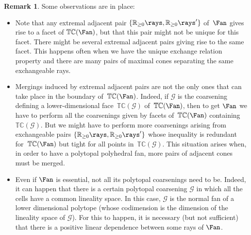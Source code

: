 \documentclass{amsart}
\theoremstyle{definition}
\newtheorem{remark}[theorem]{Remark}
\newcommand{\R}{\mathbb{R}} %
\newcommand{\cal}[1]{{\mathcal{#1}}} %
\newcommand{\typeCone}{\mathbb{TC}} %
\newcommand{\ctypeCone}{\smash{\overline{\mathbb{TC}}}} %
\begin{document}
\begin{remark}
Some observations are in place:

\begin{itemize}
\item Note that any extremal adjacent pair $\{\R_{\ge0}\rays, \R_{\ge0}\rays'\}$ of~$\Fan$ gives rise to a facet of $\ctypeCone(\Fan)$, but that this pair might not be unique for this facet. There might be several extremal adjacent pairs giving rise to the same facet. This happens often when we have the unique exchange relation property and there are many pairs of maximal cones separating the same exchangeable rays.
 
\item Mergings induced by extremal adjacent pairs are not the only ones that can take place in the boundary of~$\ctypeCone(\Fan)$. Indeed, if $\cal{G}$ is the coarsening defining a lower-dimensional face~$\typeCone(\cal{G})$ of~$\ctypeCone(\Fan)$, then to get $\Fan$ we have to perform all the coarsenings given by facets of~$\ctypeCone(\Fan)$ containing~$\typeCone(\cal{G})$. But we might have to perform more coarsenings arising from exchangeable pairs  $\{\R_{\ge0}\rays, \R_{\ge0}\rays'\}$ whose inequality is redundant for~$\ctypeCone(\Fan)$ but tight for all points in~$\typeCone(\cal{G})$. This situation arises when, in order to have a polytopal polyhedral fan, more pairs of adjacent cones must be merged.

\item Even if $\Fan$ is essential, not all its polytopal coarsenings need to be. Indeed, it can happen that there is a certain polytopal coarsening $\cal{G}$ in which all the cells have a common lineality space. In this case, $\cal{G}$ is the normal fan of a lower dimensional polytope (whose codimension is the dimension of the lineality space of $\cal{G}$). For this to happen, it is necessary (but not sufficient) that there is a positive linear dependence between some rays of $\Fan$. 
\end{itemize}
\end{remark}
\end{document}

